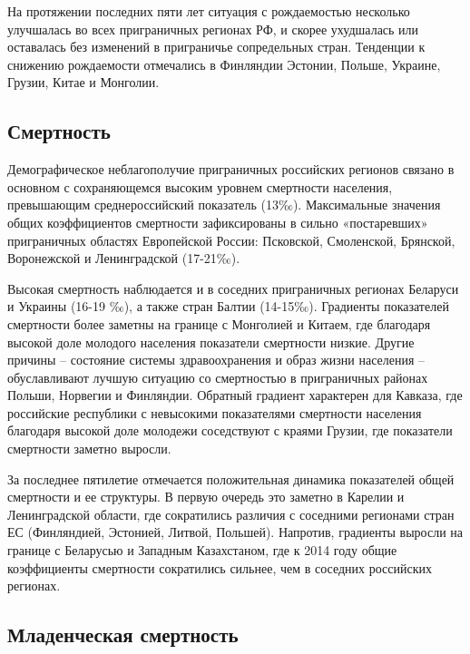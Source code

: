\documentclass[]{book}
\begin{document}
На протяжении последних пяти лет ситуация с рождаемостью несколько
улучшалась во всех приграничных регионах РФ, и скорее ухудшалась или
оставалась без изменений в приграничье сопредельных стран. Тенденции к
снижению рождаемости отмечались в Финляндии Эстонии, Польше, Украине,
Грузии, Китае и Монголии.

\subsection{Смертность}\label{demo-situ-dea}

Демографическое неблагополучие приграничных российских регионов связано
в основном с сохраняющемся высоким уровнем смертности населения,
превышающим среднероссийский показатель (13‰). Максимальные значения
общих коэффициентов смертности зафиксированы в сильно «постаревших»
приграничных областях Европейской России: Псковской, Смоленской,
Брянской, Воронежской и Ленинградской (17-21‰).

Высокая смертность наблюдается и в соседних приграничных регионах
Беларуси и Украины (16-19 ‰), а также стран Балтии (14-15‰). Градиенты
показателей смертности более заметны на границе с Монголией и Китаем,
где благодаря высокой доле молодого населения показатели смертности
низкие. Другие причины -- состояние системы здравоохранения и образ
жизни населения -- обуславливают лучшую ситуацию со смертностью в
приграничных районах Польши, Норвегии и Финляндии. Обратный градиент
характерен для Кавказа, где российские республики с невысокими
показателями смертности населения благодаря высокой доле молодежи
соседствуют с краями Грузии, где показатели смертности заметно выросли.

За последнее пятилетие отмечается положительная динамика показателей
общей смертности и ее структуры. В первую очередь это заметно в Карелии
и Ленинградской области, где сократились различия с соседними регионами
стран ЕС (Финляндией, Эстонией, Литвой, Польшей). Напротив, градиенты
выросли на границе с Беларусью и Западным Казахстаном, где к 2014 году
общие коэффициенты смертности сократились сильнее, чем в соседних
российских регионах.

\subsection{Младенческая смертность}\label{demo-situ-bab}
\end{document}
